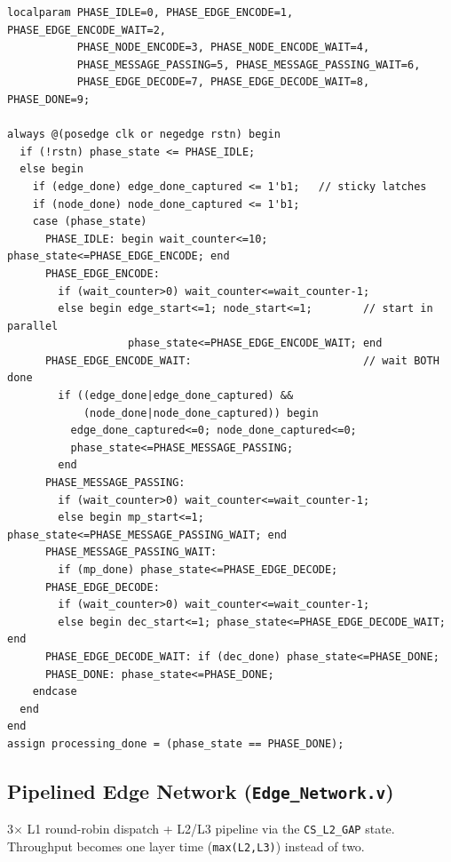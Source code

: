\documentclass[10pt,a4paper]{article}
\begin{document}
\begin{lstlisting}
localparam PHASE_IDLE=0, PHASE_EDGE_ENCODE=1, PHASE_EDGE_ENCODE_WAIT=2,
           PHASE_NODE_ENCODE=3, PHASE_NODE_ENCODE_WAIT=4,
           PHASE_MESSAGE_PASSING=5, PHASE_MESSAGE_PASSING_WAIT=6,
           PHASE_EDGE_DECODE=7, PHASE_EDGE_DECODE_WAIT=8, PHASE_DONE=9;

always @(posedge clk or negedge rstn) begin
  if (!rstn) phase_state <= PHASE_IDLE;
  else begin
    if (edge_done) edge_done_captured <= 1'b1;   // sticky latches
    if (node_done) node_done_captured <= 1'b1;
    case (phase_state)
      PHASE_IDLE: begin wait_counter<=10; phase_state<=PHASE_EDGE_ENCODE; end
      PHASE_EDGE_ENCODE:
        if (wait_counter>0) wait_counter<=wait_counter-1;
        else begin edge_start<=1; node_start<=1;        // start in parallel
                   phase_state<=PHASE_EDGE_ENCODE_WAIT; end
      PHASE_EDGE_ENCODE_WAIT:                           // wait BOTH done
        if ((edge_done|edge_done_captured) &&
            (node_done|node_done_captured)) begin
          edge_done_captured<=0; node_done_captured<=0;
          phase_state<=PHASE_MESSAGE_PASSING;
        end
      PHASE_MESSAGE_PASSING:
        if (wait_counter>0) wait_counter<=wait_counter-1;
        else begin mp_start<=1; phase_state<=PHASE_MESSAGE_PASSING_WAIT; end
      PHASE_MESSAGE_PASSING_WAIT:
        if (mp_done) phase_state<=PHASE_EDGE_DECODE;
      PHASE_EDGE_DECODE:
        if (wait_counter>0) wait_counter<=wait_counter-1;
        else begin dec_start<=1; phase_state<=PHASE_EDGE_DECODE_WAIT; end
      PHASE_EDGE_DECODE_WAIT: if (dec_done) phase_state<=PHASE_DONE;
      PHASE_DONE: phase_state<=PHASE_DONE;
    endcase
  end
end
assign processing_done = (phase_state == PHASE_DONE);
\end{lstlisting}

\subsection{Pipelined Edge Network (\texttt{Edge\_Network.v})}
3$\times$ L1 round-robin dispatch + L2/L3 pipeline via the
\texttt{CS\_L2\_GAP} state. Throughput becomes one layer time
(\texttt{max(L2,L3)}) instead of two.
\end{document}
